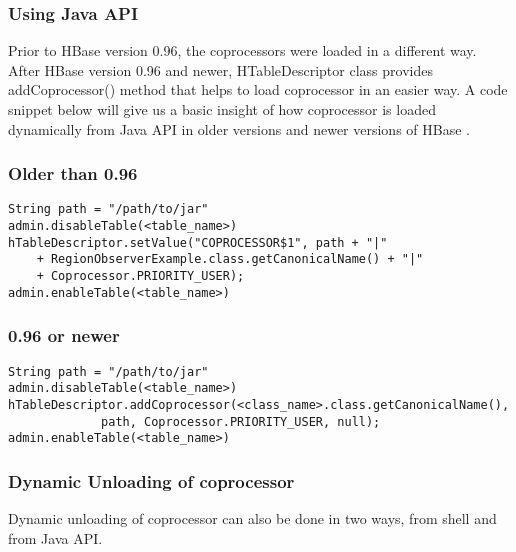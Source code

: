 \documentclass[11pt,a4paper,bibtotoc,idxtotoc,headsepline,footsepline,footexclude,BCOR12mm,DIV13]{scrbook}
\begin{document}
\subsubsection{Using Java API}
Prior to HBase version 0.96, the coprocessors were loaded in a different way. After HBase version 0.96 and newer, HTableDescriptor class provides addCoprocessor() method that helps to load coprocessor in an easier way. A code snippet below will give us a basic insight of how coprocessor is loaded dynamically from Java API in older versions and newer versions of HBase \cite{hbase:site} .

\subsubsection{Older than 0.96}
\lstset{language=Java}
\begin{lstlisting}
String path = "/path/to/jar"
admin.disableTable(<table_name>)
hTableDescriptor.setValue("COPROCESSOR$1", path + "|"
    + RegionObserverExample.class.getCanonicalName() + "|"
    + Coprocessor.PRIORITY_USER);
admin.enableTable(<table_name>)
\end{lstlisting}

\subsubsection{0.96 or newer} 
\lstset{language=Java}
\begin{lstlisting}
String path = "/path/to/jar"
admin.disableTable(<table_name>)
hTableDescriptor.addCoprocessor(<class_name>.class.getCanonicalName(),
             path, Coprocessor.PRIORITY_USER, null);
admin.enableTable(<table_name>)
\end{lstlisting}

\subsubsection{Dynamic Unloading of coprocessor}
Dynamic unloading of coprocessor can also be done in two ways, from shell and from Java API. 
\end{document}

